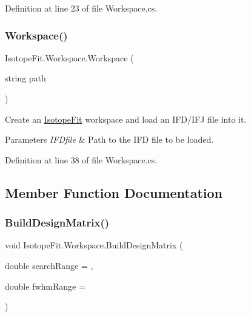 Definition at line 23 of file Workspace.\+cs.

\mbox{\label{class_isotope_fit_1_1_workspace_a5aa1f6546513d331f262d383fe6b0358}} 
\subsubsection{\texorpdfstring{Workspace()}{Workspace()}\hspace{0.1cm}{\footnotesize\ttfamily [2/2]}}
{\footnotesize\ttfamily Isotope\+Fit.\+Workspace.\+Workspace (\begin{DoxyParamCaption}\item[{string}]{path }\end{DoxyParamCaption})}



Create an \hyperlink{namespace_isotope_fit}{Isotope\+Fit} workspace and load an I\+F\+D/\+I\+FJ file into it. 


\begin{DoxyParams}{Parameters}
{\em I\+F\+Dfile} & Path to the I\+FD file to be loaded.\\
\hline
\end{DoxyParams}


Definition at line 38 of file Workspace.\+cs.



\subsection{Member Function Documentation}
\mbox{\label{class_isotope_fit_1_1_workspace_a760f024c67d57242c40c558298bd1878}} 
\subsubsection{\texorpdfstring{Build\+Design\+Matrix()}{BuildDesignMatrix()}}
{\footnotesize\ttfamily void Isotope\+Fit.\+Workspace.\+Build\+Design\+Matrix (\begin{DoxyParamCaption}\item[{double}]{search\+Range = {},  }\item[{double}]{fwhm\+Range = {} }\end{DoxyParamCaption})}



